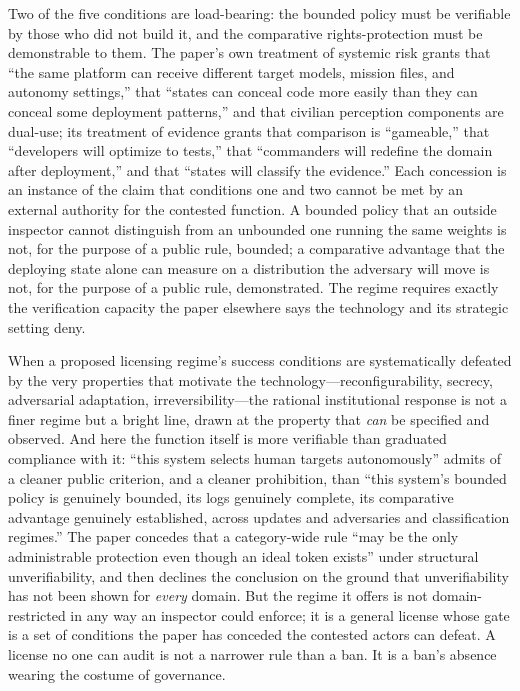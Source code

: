 \documentclass[11pt]{article}
\begin{document}
Two of the five conditions are load-bearing: the bounded policy must be verifiable by those who did not build it, and the comparative rights-protection must be demonstrable to them. The paper's own treatment of systemic risk grants that ``the same platform can receive different target models, mission files, and autonomy settings,'' that ``states can conceal code more easily than they can conceal some deployment patterns,'' and that civilian perception components are dual-use; its treatment of evidence grants that comparison is ``gameable,'' that ``developers will optimize to tests,'' that ``commanders will redefine the domain after deployment,'' and that ``states will classify the evidence.'' Each concession is an instance of the claim that conditions one and two cannot be met by an external authority for the contested function. A bounded policy that an outside inspector cannot distinguish from an unbounded one running the same weights is not, for the purpose of a public rule, bounded; a comparative advantage that the deploying state alone can measure on a distribution the adversary will move is not, for the purpose of a public rule, demonstrated. The regime requires exactly the verification capacity the paper elsewhere says the technology and its strategic setting deny.

When a proposed licensing regime's success conditions are systematically defeated by the very properties that motivate the technology---reconfigurability, secrecy, adversarial adaptation, irreversibility---the rational institutional response is not a finer regime but a bright line, drawn at the property that \emph{can} be specified and observed. And here the function itself is more verifiable than graduated compliance with it: ``this system selects human targets autonomously'' admits of a cleaner public criterion, and a cleaner prohibition, than ``this system's bounded policy is genuinely bounded, its logs genuinely complete, its comparative advantage genuinely established, across updates and adversaries and classification regimes.'' The paper concedes that a category-wide rule ``may be the only administrable protection even though an ideal token exists'' under structural unverifiability, and then declines the conclusion on the ground that unverifiability has not been shown for \emph{every} domain. But the regime it offers is not domain-restricted in any way an inspector could enforce; it is a general license whose gate is a set of conditions the paper has conceded the contested actors can defeat. A license no one can audit is not a narrower rule than a ban. It is a ban's absence wearing the costume of governance.
\end{document}
